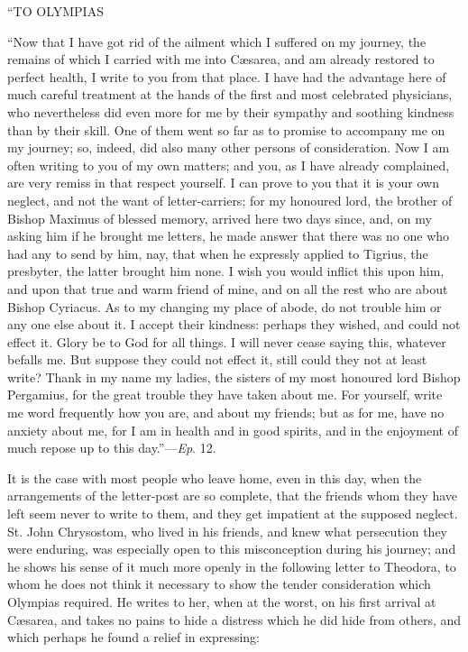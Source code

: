 ``TO
OLYMPIAS

``Now that I have got rid of the ailment which I suffered on my
journey, the remains of which I carried with me into Cæsarea, and am
already restored to perfect health, I write to you from that place. I
have had the advantage here of much careful treatment at
the hands of the first and most celebrated physicians, who
nevertheless did even more for me by their sympathy and soothing
kindness than by their skill. One of them went so far as to promise to
accompany me on my journey; so, indeed, did also many other persons of
consideration. Now I am often writing to you of my own matters; and
you, as I have already complained, are very remiss in that respect
yourself. I can prove to you that it is your own neglect, and not the
want of letter-carriers; for my honoured lord, the brother of Bishop
Maximus of blessed memory, arrived here two days since, and, on my
asking him if he brought me letters, he made answer that there was no
one who had any to send by him, nay, that when he expressly applied to
Tigrius, the presbyter, the latter brought him none. I wish you would
inflict this upon him, and upon that true and warm friend of mine, and
on all the rest who are about Bishop Cyriacus. As to my changing my
place of abode, do not trouble him or any one else about it. I accept
their kindness: perhaps they wished, and could not effect it. Glory be
to God for all things. I will never cease saying this, whatever
befalls me. But suppose they could not effect it, still could they not
at least write? Thank in my name my ladies, the sisters of my most
honoured lord Bishop Pergamius, for the great trouble they have taken
about me. For yourself, write me word frequently how you are, and
about my friends; but as for me, have no anxiety about me, for I am in
health and in good spirits, and in the enjoyment of much repose up to
this day.''—\emph{Ep}. 12.

It is the case with most people who leave home, even in this day,
when the arrangements of the letter-post are so complete, that the
friends whom they have left seem never to write to them, and they get
impatient at the supposed neglect. St. John Chrysostom, who lived in
his friends, and knew what persecution they were enduring, was
especially open to this misconception during his journey; and he shows
his sense of it much more openly in the following letter to Theodora,
to whom he does not think it necessary to show the tender
consideration which Olympias required. He writes to her, when at the
worst, on his first arrival at Cæsarea, and takes no pains to
hide a distress which he did hide from others, and which perhaps he
found a relief in expressing:

